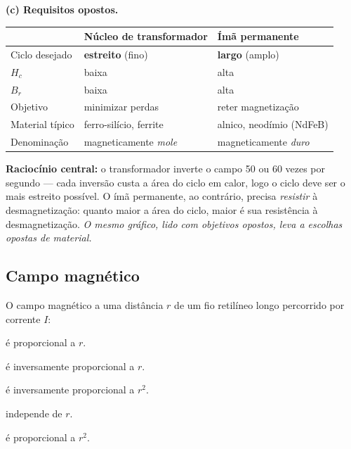 \begin{questao}[3]{}
{\textbf{(c) Requisitos opostos.}
\begin{center}\small\sffamily
\begin{tabular}{@{}l l l@{}}
\toprule
 & \textbf{Núcleo de transformador} & \textbf{Ímã permanente}\\
\midrule
Ciclo desejado & \textbf{estreito} (fino) & \textbf{largo} (amplo)\\
$H_c$ & baixa & alta\\
$B_r$ & baixa & alta\\
Objetivo & minimizar perdas & reter magnetização\\
Material típico & ferro-silício, ferrite & alnico, neodímio (NdFeB)\\
Denominação & magneticamente \emph{mole} & magneticamente \emph{duro}\\
\bottomrule
\end{tabular}
\end{center}
\textbf{Raciocínio central:} o transformador inverte o campo 50 ou 60 vezes por
segundo --- cada inversão custa a área do ciclo em calor, logo o ciclo deve ser o
mais estreito possível. O ímã permanente, ao contrário, precisa \emph{resistir} à
desmagnetização: quanto maior a área do ciclo, maior é sua resistência à desmagnetização. \emph{O mesmo
gráfico, lido com objetivos opostos, leva a escolhas opostas de material.}}
\end{questao}




\subsection{Campo magnético}

\blocofixacao

\begin{questao}[1]{}
O campo magnético a uma distância $r$ de um fio retilíneo longo percorrido por
corrente $I$:
\begin{alternativas}
\item é proporcional a $r$.
\item é inversamente proporcional a $r$.
\item é inversamente proporcional a $r^2$.
\item independe de $r$.
\item é proporcional a $r^2$.
\end{alternativas}
\end{questao}

